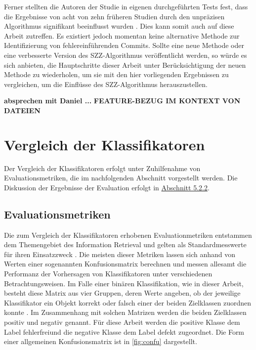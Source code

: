 Ferner stellten die Autoren der Studie in eigenen durchgeführten Tests fest, dass die Ergebnisse von acht von zehn früheren Studien durch den unpräzisen Algorithmus signifikant beeinflusst wurden \cite{Wen2019}. Dies kann somit auch auf diese Arbeit zutreffen. Es existiert jedoch momentan keine alternative Methode zur Identifizierung von fehlereinführenden Commits. Sollte eine neue Methode oder eine verbesserte Version des SZZ-Algorithmus veröffentlicht werden, so würde es sich anbieten, die Hauptschritte dieser Arbeit unter Berücksichtigung der neuen Methode zu wiederholen, um sie mit den hier vorliegenden Ergebnissen zu vergleichen, um die Einflüsse des SZZ-Algorithmus herauszustellen.


\textbf{absprechen mit Daniel ...}
\textbf{FEATURE-BEZUG IM KONTEXT VON DATEIEN}

\section{Vergleich der Klassifikatoren}

Der Vergleich der Klassifikatoren erfolgt unter Zuhilfenahme von Evaluationsmetriken, die im nachfolgenden Abschnitt vorgestellt werden. Die Diskussion der Ergebnisse der Evaluation erfolgt in \hyperref[results]{Abschnitt 5.2.2}.

\subsection{Evaluationsmetriken}
\label{eval-metrics}

Die zum Vergleich der Klassifikatoren erhobenen Evaluationmetriken entstammen dem Themengebiet des Information Retrieval und gelten als Standardmesswerte für ihren Einsatzzweck \cite{Sammut2017}. Die meisten dieser Metriken lassen sich anhand von Werten einer sogenannten Konfusionsmatrix berechnen und messen allesamt die Performanz der Vorhersagen von Klassifikatoren unter verschiedenen Betrachtungsweisen. Im Falle einer binären Klassifikation, wie in dieser Arbeit, besteht diese Matrix aus vier Gruppen, deren Werte angeben, ob der jeweilige Klassifikator ein Objekt korrekt oder falsch einer der beiden Zielklassen zuordnen konnte \cite{Sammut2017}. Im Zusammenhang mit solchen Matrizen werden die beiden Zielklassen \glqq positiv\grqq{} und \glqq negativ\grqq{} genannt. Für diese Arbeit werden die positive Klasse dem Label \glqq fehlerfrei\grqq und die negative Klasse dem Label \glqq defekt\grqq{} zugeordnet. Die Form einer allgemeinen Konfusionsmatrix ist in \autoref{fig:confu} dargestellt.

